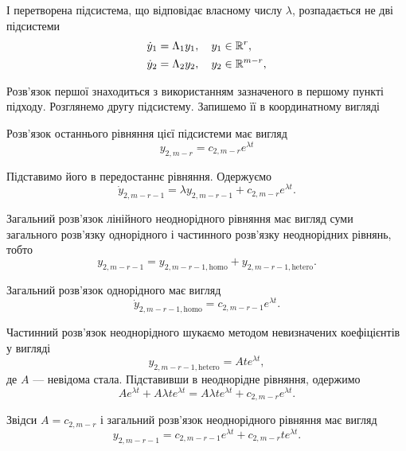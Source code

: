 \begin{enumerate}
І перетворена підсистема, що відповідає власному числу $\lambda$, розпадається не дві підсистеми
\begin{align*}
	\dot y_1 &= \Lambda_1 y_1, \quad y_1 \in \mathbb{R}^r, \\
	\dot y_2 &= \Lambda_2 y_2, \quad y_2 \in \mathbb{R}^{m - r},
\end{align*}

Розв’язок першої знаходиться з використанням зазначеного в першому пункті підходу. Розглянемо другу підсистему. Запишемо її в координатному вигляді
 
Розв’язок останнього рівняння цієї підсистеми має вигляд
\begin{equation*}
	y_{2, m - r} = c_{2, m - r} e^{\lambda t}
\end{equation*}

Підставимо його в передостаннє рівняння. Одержуємо
\begin{equation*}
	\dot y_{2, m - r - 1} = \lambda y_{2, m - r - 1} + c_{2, m - r} e^{\lambda t}.
\end{equation*}

Загальний розв’язок лінійного неоднорідного рівняння має вигляд суми загального розв’язку однорідного і частинного розв’язку неоднорідних рівнянь, тобто
\begin{equation*}
	y_{2, m - r - 1} = y_{2, m - r - 1, \text{homo}} + y_{2, m - r - 1, \text{hetero}}.
\end{equation*}

Загальний розв’язок однорідного має вигляд
\begin{equation*}
	\dot y_{2, m - r - 1, \text{homo}} = c_{2, m - r - 1} e^{\lambda t}.
\end{equation*}

Частинний розв’язок неоднорідного шукаємо методом невизначених коефіцієнтів у вигляді
\begin{equation*}
	y_{2, m - r - 1, \text{hetero}} = A t e^{\lambda t},
\end{equation*}
де $A$ --- невідома стала. Підставивши в неоднорідне рівняння, одержимо
\begin{equation*}
	A e^{\lambda t} + A \lambda t e^{\lambda t} = A \lambda t e^{\lambda t} + c_{2, m - r} e^{\lambda t}.
\end{equation*}

Звідси $A = c_{2, m - r}$ і загальний розв’язок неоднорідного рівняння має вигляд
\begin{equation*}
	y_{2, m - r - 1} = c_{2, m - r - 1} e^{\lambda t} + c_{2, m - r} t e^{\lambda t}.
\end{equation*}


\end{enumerate}
